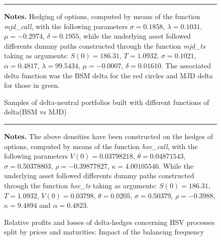 \documentclass[12pt]{report}
\begin{document}
\begin{appendices}


\begin{figure}[h]
  \centering
  \rule{40mm}{20mm}
  \caption{Samples of delta-neutral portfolios built with different functions of delta(BSM vs MJD)}
  \begin{changemargin}{0.5cm}{0.5cm}
  \medskip
\footnotesize
{}\textbf{Notes.} Hedging of options, computed by means of the function \textit{mjd\_call}, with the following parameters $\sigma = 0.1858$, $\lambda = 0.1031$, $\mu = -0.2974$, $\delta = 0.1955$, while the underlying asset followed differents dummy paths constructed through the function \textit{mjd\_ts} taking as arguments: $S(0) = 186.31$, $T = 1.0932$, $\sigma = 0.1021$, $\alpha = 0.4817$, $\lambda = 99.5434$, $\mu = -0.0007$, $\delta = 0.01610$. The associated delta function was the BSM delta for the red circles and MJD delta for those in green.
  \end{changemargin}
  \label{p:analysis:mjd:hedge:deltas}
\end{figure}






\begin{figure}[h]
  \centering
  \rule{40mm}{20mm}
  \caption{Relative profits and losses of delta-hedges concerning HSV processes split by prices and maturities: Impact of the balancing frequency}
  \begin{changemargin}{0.5cm}{0.5cm}
  \medskip
\footnotesize
{}\textbf{Notes.} The above densities have been constructed on the hedges of options, computed by means of the function \textit{hsv\_call}, with the following parameters $V(0) = 0.03798218$, $\theta = 0.04871543$, $\sigma = 0.50378803$, $\rho = -0.39877827$, $\kappa = 4.00105546$. While the underlying asset followed differents dummy paths constructed through the function \textit{hsv\_ts} taking as arguments: $S(0) = 186.31$, $T = 1.0932$, $V(0) = 0.03798$, $\theta = 0.0205$, $\sigma = 0.50379$, $\rho = -0.3988$,  $\kappa = 9.4894$ and $\alpha  = 0.4823$. 
  \end{changemargin}
  \label{p:analysis:hsv:pl:dist:big}
\end{figure}


\end{appendices}












\end{document}
